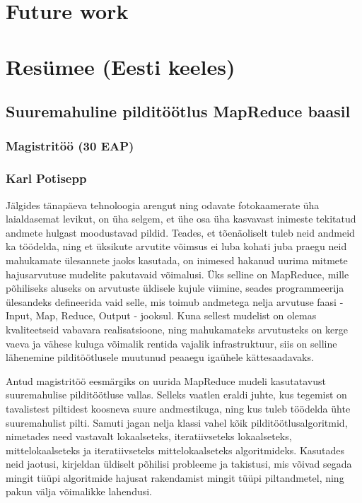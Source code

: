 \documentclass [12pt,a4paper]{report}
\begin{document}
\chapter{Future work}

\listoffigures

\chapter*{Resümee (Eesti keeles)}

\section*{Suuremahuline pilditöötlus MapReduce baasil}
\subsection*{Magistritöö (30 EAP)}
\subsection*{Karl Potisepp}

Jälgides tänapäeva tehnoloogia arengut ning odavate fotokaamerate üha laialdasemat levikut, on üha selgem, et ühe osa üha kasvavast inimeste tekitatud andmete hulgast moodustavad pildid. Teades, et tõenäoliselt tuleb neid andmeid ka töödelda, ning et üksikute arvutite võimsus ei luba kohati juba praegu neid mahukamate ülesannete jaoks kasutada, on inimesed hakanud uurima mitmete hajusarvutuse mudelite pakutavaid võimalusi. Üks selline on MapReduce, mille põhiliseks aluseks on arvutuste üldisele kujule viimine, seades programmeerija ülesandeks defineerida vaid selle, mis toimub andmetega nelja arvutuse faasi - Input, Map, Reduce, Output - jooksul. Kuna sellest mudelist on olemas kvaliteetseid vabavara realisatsioone, ning mahukamateks arvutusteks on kerge vaeva ja vähese kuluga võimalik rentida vajalik infrastruktuur, siis on selline lähenemine pilditöötlusele muutunud peaaegu igaühele kättesaadavaks.

Antud magistritöö eesmärgiks on uurida MapReduce mudeli kasutatavust suuremahulise pilditöötluse vallas. Selleks vaatlen eraldi juhte, kus tegemist on tavalistest piltidest koosneva suure andmestikuga, ning kus tuleb töödelda ühte suuremahulist pilti. Samuti jagan nelja klassi vahel kõik pilditöötlusalgoritmid, nimetades need vastavalt lokaalseteks, iteratiivseteks lokaalseteks, mittelokaalseteks ja iteratiivseteks mittelokaalseteks algoritmideks. Kasutades neid jaotusi, kirjeldan üldiselt põhilisi probleeme ja takistusi, mis võivad segada mingit tüüpi algoritmide hajusat rakendamist
mingit tüüpi piltandmetel, ning pakun välja võimalikke lahendusi.
\end{document}
